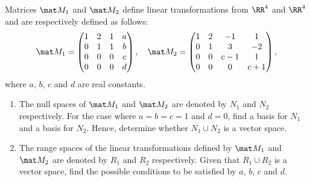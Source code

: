 \begin{problem}
    Matrices $\mat M_1$ and $\mat M_2$ define linear transformations from $\RR^4$ and $\RR^4$ and are respectively defined as follows: \[\mat M_1 = \begin{pmatrix}1 & 2 & 1 & a \\ 0 & 1 & 1 & b \\ 0 & 0 & 0 & c \\ 0 & 0 & 0 & d\end{pmatrix}, \quad \mat M_2 = \begin{pmatrix} 1 & 2 & -1 & 1 \\ 0 & 1 & 3 & -2 \\ 0 & 0 & c-1 & 1 \\ 0 & 0 & 0 & c+1 \end{pmatrix},\] where $a$, $b$, $c$ and $d$ are real constants.

    \begin{enumerate}
        \item The null spaces of $\mat M_1$ and $\mat M_2$ are denoted by $N_1$ and $N_2$ respectively. For the case where $a = b = c = 1$ and $d = 0$, find a basis for $N_1$ and a basis for $N_2$. Hence, determine whether $N_1 \cup N_2$ is a vector space.
        \item The range spaces of the linear transformations defined by $\mat M_1$ and $\mat M_2$ are denoted by $R_1$ and $R_2$ respectively. Given that $R_1 \cup R_2$ is a vector space, find the possible conditions to be satisfied by $a$, $b$, $c$ and $d$.
    \end{enumerate}
\end{problem}